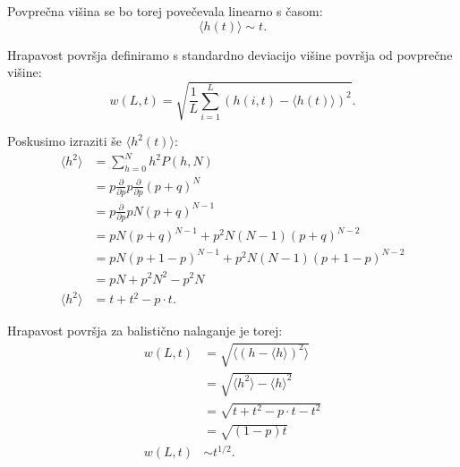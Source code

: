 \documentclass[a4paper, twoside, 12pt]{book}
\begin{document}
Povprečna višina se bo torej povečevala linearno s časom:
\begin{equation}
  \langle h(t) \rangle \sim t.
\end{equation}

Hrapavost površja definiramo s standardno deviacijo višine površja od povprečne višine:
  \begin{equation}
    w(L,t) = \sqrt{\frac{1}{L} \sum_{i=1}^L (h(i,t)-\langle h(t) \rangle)^2}.
    \label{sirina-povrsine}
  \end{equation}

Poskusimo izraziti še $\langle h^2(t) \rangle $:
\begin{align}
  \langle h^2 \rangle &= \sum_{h=0}^{N} h^2 P(h,N) \\
  &= p \frac{\partial}{\partial p}p \frac{\partial}{\partial p} (p + q)^N \\
  &= p \frac{\partial}{\partial p} p N (p + q)^{N-1} \\
  &= p N (p + q)^{N-1} + p^2 N (N - 1) (p + q)^{N-2} \\
  &= p N (p + 1 - p)^{N-1} + p^2 N (N - 1) (p + 1 - p)^{N-2} \\
  &= p N + p^2 N^2 - p^2 N \\
  \langle h^2 \rangle &= t + t^2 - p \cdot t.
\end{align}

Hrapavost površja za balistično nalaganje je torej:
\begin{align}
  w(L,t) &= \sqrt{\langle (h - \langle h \rangle)^2\rangle} \\
  &= \sqrt{\langle h^2 \rangle - \langle h \rangle^2} \\
  &= \sqrt{t + t^2 - p \cdot t - t^2} \\
  &= \sqrt{(1-p)t} \\
  w(L,t) &\sim t^{1/2}.
\end{align}
\end{document}
